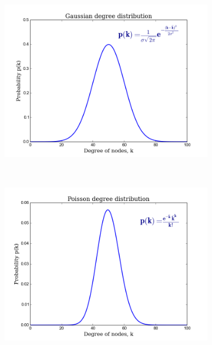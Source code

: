 \documentclass[10pt,a4paper]{article}
\theoremstyle{plain}
\theoremstyle{definition}
\begin{document}
\begin{figure}[H]
	\centering
	\begin{subfigure}[b]{0.45\textwidth}
		\includegraphics[width=\textwidth]{images/gaussian.png}
		\caption{}
		\label{gauss}
	\end{subfigure}~ 
	\begin{subfigure}[b]{0.45\textwidth}
		\includegraphics[width=\textwidth]{images/pois.png}
		\caption{}
		\label{poss}
	\end{subfigure} \\   
	\begin{subfigure}[b]{0.45\textwidth}

\end{subfigure}
\end{figure}
\end{document}
